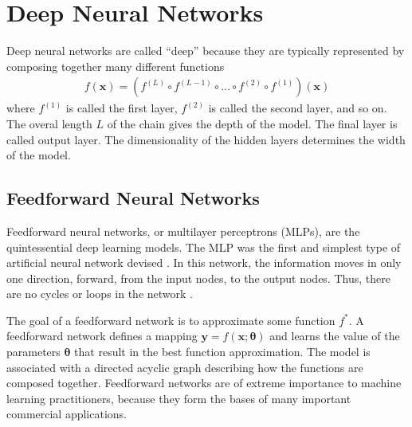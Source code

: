 \documentclass{scrartcl}
\begin{document}



\newpage


\section{Deep Neural Networks}
\label{sec:dnn}

Deep neural networks are called ``deep'' because they are typically represented by composing together many different functions
\begin{align}
f(\mathbf x) = (f^{(L)} \circ f^{(L-1)} \circ \dots \circ f^{(2)} \circ f^{(1)})(\mathbf x)
\end{align} 
where $f^{(1)}$ is called the first layer, $f^{(2)}$ is called the second layer, and so on. The overal length $L$ of the chain gives the depth of the model. The final layer is called output layer. The dimensionality of the hidden layers determines the width of the model. 

\subsection{Feedforward Neural Networks}

Feedforward neural networks, or multilayer perceptrons (MLPs), are the quintessential deep learning models. The MLP was the first and simplest type of artificial neural network devised \cite{Schmidhuber2015}. In this network, the information moves in only one direction, forward, from the input nodes, to the output nodes. Thus, there are no cycles or loops in the network \cite{Zell1994}.

The goal of a feedforward network is to approximate some function $f^*$. A feedforward network defines a mapping $\mathbf y = f(\mathbf x; \boldsymbol \theta)$ and learns the value of the parameters $\boldsymbol \theta$ that result in the best function approximation. The model is associated with a directed acyclic graph describing how the functions are composed together. Feedforward networks are of extreme importance to machine learning practitioners, because they form the bases of many important commercial applications. 
\end{document}
